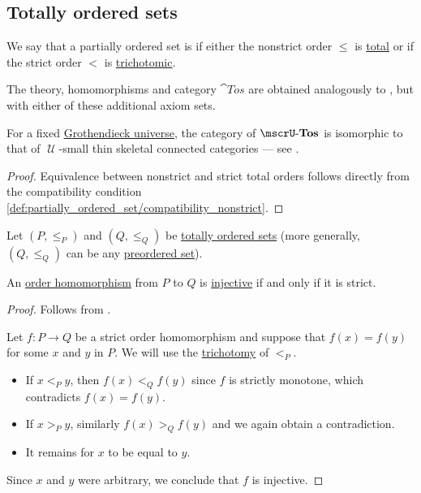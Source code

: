 \subsection{Totally ordered sets}\label{subsec:totally_ordered_sets}

\begin{definition}\label{def:totally_ordered_set}
  We say that a partially ordered set is  if either the nonstrict order \( \leq \) is \hyperref[def:binary_relation/total]{total} or if the strict order \( < \) is \hyperref[def:binary_relation/trichotomic]{trichotomic}.

  The theory, homomorphisms and category \( \cat{Tos} \) are obtained analogously to , but with either of these additional axiom sets.

  For a fixed \hyperref[def:grothendieck_universe]{Grothendieck universe}, the category of \( \ucat{Tos} \) is isomorphic to that of \( \mscrU \)-small thin skeletal connected categories --- see .
\end{definition}
\begin{proof}
  Equivalence between nonstrict and strict total orders follows directly from the compatibility condition \eqref{def:partially_ordered_set/compatibility_nonstrict}.
\end{proof}

\begin{proposition}\label{thm:total_order_embedding_iff_strict}
  Let \( (P, \leq_P) \) and \( (Q, \leq_Q) \) be \hyperref[def:totally_ordered_set]{totally ordered sets} (more generally, \( (Q, \leq_Q) \) can be any \hyperref[def:preordered_set]{preordered set}).

  An \hyperref[def:partially_ordered_set/homomorphism]{order homomorphism} from \( P \) to \( Q \) is \hyperref[def:function_invertibility/injective]{injective} if and only if it is strict.
\end{proposition}
\begin{proof}
  \SufficiencySubProof Follows from .

  \NecessitySubProof Let \( f: P \to Q \) be a strict order homomorphism and suppose that \( f(x) = f(y) \) for some \( x \) and \( y \) in \( P \). We will use the \hyperref[def:binary_relation/trichotomic]{trichotomy} of \( <_P \).
  \begin{itemize}
    \item If \( x <_P y \), then \( f(x) <_Q f(y) \) since \( f \) is strictly monotone, which contradicts \( f(x) = f(y) \).

    \item If \( x >_P y \), similarly \( f(x) >_Q f(y) \) and we again obtain a contradiction.

    \item It remains for \( x \) to be equal to \( y \).
  \end{itemize}

  Since \( x \) and \( y \) were arbitrary, we conclude that \( f \) is injective.
\end{proof}

